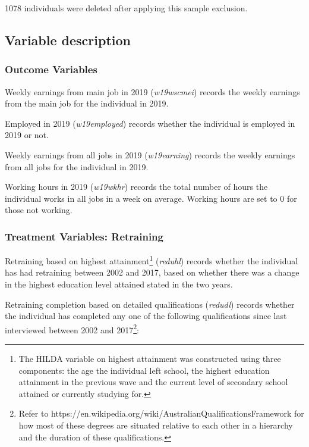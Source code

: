 \documentclass[12pt, a4paper]{article}
\begin{document}
1078 individuals were deleted after applying this sample exclusion.

\subsection{Variable description}

\subsubsection{Outcome Variables}
Weekly earnings from main job in 2019 (\textit{w19\textunderscore{}wscmei}) records the weekly earnings from the main job for the individual in 2019. 

Employed in 2019 (\textit{w19\textunderscore{}employed}) records whether the individual is employed in 2019 or not. 

Weekly earnings from all jobs in 2019 (\textit{w19\textunderscore{}earning}) records the weekly earnings from all jobs for the individual in 2019. 

Working hours in 2019 (\textit{w19\textunderscore{}wkhr}) records the total number of hours the individual works in all jobs in a week on average. Working hours are set to 0 for those not working. 

\subsubsection{Treatment Variables: Retraining}
Retraining based on highest attainment\footnote{The HILDA variable on highest attainment was constructed using three components: the age the individual left school, the highest education attainment in the previous wave and the current level of secondary school attained or currently studying for.} (\textit{reduhl}) records whether the individual has had retraining between 2002 and 2017, based on whether there was a change in the highest education level attained stated in the two years.  

Retraining completion based on detailed qualifications (\textit{redudl}) records whether the individual has completed any one of the following qualifications since last interviewed between 2002 and 2017\footnote{Refer to https://en.wikipedia.org/wiki/Australian\textunderscore{}Qualifications\textunderscore{}Framework for how most of these degrees are situated relative to each other in a hierarchy and the duration of these qualifications.}:
\end{document}
